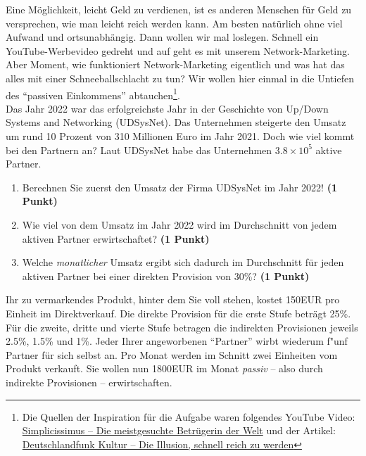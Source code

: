 \documentclass[a4paper, 9pt]{scrartcl}\usepackage[]{graphicx}\usepackage[]{xcolor}
\begin{document}
Eine M{\"o}glichkeit, leicht Geld zu verdienen, ist es anderen Menschen f{\"u}r Geld
zu versprechen, wie man leicht reich werden kann. Am besten nat{\"u}rlich ohne
viel Aufwand und ortsunabh{\"a}ngig. Dann wollen wir mal loslegen. Schnell
ein YouTube-Werbevideo gedreht und auf geht es mit unserem
Network-Marketing. Aber Moment, wie funktioniert Network-Marketing
eigentlich und was hat das alles mit einer Schneeballschlacht zu tun? Wir
wollen hier einmal in die Untiefen des "`passiven Einkommens"'
abtauchen\footnote{Die Quellen der Inspiration f{\"u}r die Aufgabe waren
  folgendes YouTube Video:
  \href{https://youtu.be/UOKkZF_qK9M?si=uf4foJVFKfeQMwSw}{Simplicissimus --
    Die meistgesuchte Betr{\"u}gerin der Welt} und der Artikel:
  \href{https://www.deutschlandfunkkultur.de/netzwerk-marketing-die-illusion-schnell-reich-zu-werden-100.html}{
    Deutschlandfunk Kultur -- Die Illusion, schnell reich zu werden}}.\\

Das Jahr 2022 war das erfolgreichste Jahr in der Geschichte von
Up/Down Systems and Networking (UDSysNet). Das Unternehmen steigerte den Umsatz um rund
10 Prozent von 310 Millionen Euro im Jahr
2021. Doch wie viel kommt bei den Partnern an? Laut
UDSysNet habe das Unternehmen \ensuremath{3.8\times 10^{5}} aktive Partner.

\begin{enumerate}
\item Berechnen Sie zuerst den Umsatz der Firma UDSysNet im
  Jahr 2022! \textbf{(1 Punkt)}
\item Wie viel von dem Umsatz im Jahr 2022 wird im Durchschnitt von jedem
  aktiven Partner erwirtschaftet? \textbf{(1 Punkt)}
\item Welche \textit{monatlicher} Umsatz ergibt sich dadurch im
  Durchschnitt f{\"u}r jeden aktiven Partner bei einer direkten Provision von
  30\%? \textbf{(1 Punkt)}
\end{enumerate}

Ihr zu vermarkendes Produkt, hinter dem Sie voll stehen, kostet
150EUR pro Einheit im Direktverkauf. Die direkte Provision
f{\"u}r die erste Stufe betr{\"a}gt 25\%. F{\"u}r die zweite, dritte und
vierte Stufe betragen die indirekten Provisionen jeweils 2.5\%,
1.5\% und 1\%. Jeder Ihrer angeworbenen "`Partner"'
wirbt wiederum f{"u}nf Partner f{\"u}r sich selbst an. Pro Monat
werden im Schnitt zwei Einheiten vom Produkt verkauft. Sie wollen nun
1800EUR im Monat \textit{passiv} -- also durch indirekte
Provisionen -- erwirtschaften.
\end{document}
